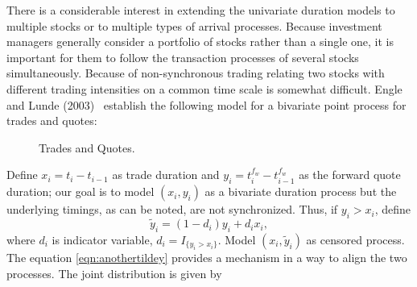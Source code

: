 There is a considerable interest in extending the univariate duration models to multiple stocks or to multiple types of arrival processes. Because investment managers generally consider a portfolio of stocks rather than a single one, it is important for them to follow the transaction processes of several stocks simultaneously. Because of non-synchronous trading relating two stocks with different trading intensities on a common time scale is somewhat difficult. Engle and Lunde (2003)~\cite{englelunde} establish the following model for a bivariate point process for trades and quotes:
	\begin{figure}[!ht]
	\centering
	\caption{Trades and Quotes.\label{fig:tradeactdoubline}}
	\end{figure}
Define $x_i = t_i - t_{i-1}$ as trade duration and $y_i = t_i^{f_w} - t_{i-1}^{f_w}$ as the forward quote duration; our goal is to model $(x_i,y_i)$ as a bivariate duration process but the underlying timings, as can be noted, are not synchronized. Thus, if $y_i > x_i$, define
	\begin{equation} \label{eqn:anothertildey}
	\widetilde{y}_i = (1 - d_i)y_i + d_ix_i,
	\end{equation}
where $d_i$ is indicator variable, $d_i = I_{\{y_i>x_i\}}$. Model $(x_i,\widetilde{y}_i)$ as censored process. The equation \eqref{eqn:anothertildey} provides a mechanism in a way to align the two processes. The joint distribution is given by
